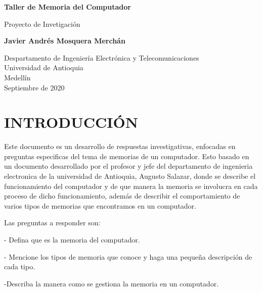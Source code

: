 \documentclass{article}
\begin{document}
\begin{titlepage}
    \begin{center}
        \vspace*{1cm}
            
        \Huge
        \textbf{Taller de Memoria del Computador}
            
        \vspace{0.5cm}
        \LARGE
        Proyecto de Invetigación
            
        \vspace{1.5cm}
            
        \textbf{Javier Andrés Mosquera Merchán}
            
        \vfill
            
        \vspace{0.8cm}
            
        \Large
        Despartamento de Ingeniería Electrónica y Telecomunicaciones\\
        Universidad de Antioquia\\
        Medellín\\
        Septiembre de 2020
            
    \end{center}
\end{titlepage}

\tableofcontents

\section{INTRODUCCIÓN}
Este documento es un desarrollo de respuestas investigativas, enfocadas en preguntas especificas del tema de memorias de un computador. Esto basado en un documento desarrollado por el profesor y jefe del departamento de ingenieria electronica de la universidad de Antioquia, Augusto Salazar, donde se describe el funcionamiento del computador y de que manera la memoria se involucra en cada proceso de dicho funcionamiento, además de describir el comportamiento de varios tipos de memorias que encontramos en un computador.\cite{referencia}

Las preguntas a responder son:

- Defina que es la memoria del computador.

- Mencione los tipos de memoria que conoce y haga una pequeña descripción de cada tipo.

-Describa la manera como se gestiona la memoria en un computador.
\end{document}
